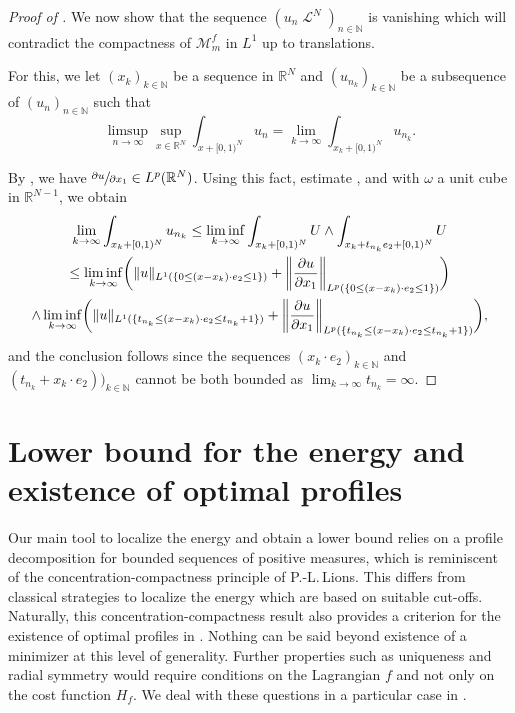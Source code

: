 \documentclass[10pt]{amsart}
\theoremstyle{plain}
\theoremstyle{definition}
\newcommand{\N}{\mathbb{N}}
\newcommand{\R}{\mathbb{R}}
\DeclarePairedDelimiter{\norm}{\lVert}{\rVert}
\DeclareMathOperator{\lbm}{\mathcal{L}}
\begin{document}
\begin{proof}[Proof of ]
We now show that the sequence \((u_n\lbm^N)_{n\in\N}\) is vanishing which will contradict the compactness of \(\mathcal{M}^f_m\) in \(L^1\) up to translations.

For this, we let \((x_k)_{k\in\N}\) be a sequence in \(\R^N\) and \((u_{n_k})_{k\in\N}\) be a subsequence of \((u_n)_{n\in\N}\) such that
\[
\limsup_{n\to\infty}\sup_{x\in\R^N}\int_{x+[0,1)^N}u_n=\lim_{k\to\infty}\int_{x_k+[0,1)^N}u_{n_k}.
\]

By , we have \(\sfrac{\partial u}{\partial x_1}\in L^p(\R^N)\). Using this fact, estimate , and  with $\omega$ a unit cube in $\R^{N-1}$, we obtain
\begin{multline*}
\lim_{k\to\infty}\int_{x_k+[0,1)^N}u_{n_k}\leq \liminf_{k\to\infty}\int_{x_k+[0,1)^N}U\wedge\int_{x_k+t_{n_k} e_2+[0,1)^N} U\\
\leq \liminf_{k\to\infty} \biggl(\norm{u}_{L^1(\{0\leq (x-x_k)\cdot e_2\leq 1\})}+
\norm*{\frac{\partial u}{\partial x_1}}_{L^p(\{0\leq (x-x_k)\cdot e_2\leq 1\})}\biggr)\\
\wedge\liminf_{k\to\infty} \biggl(
\norm{u}_{L^1(\{t_{n_k}\leq (x-x_k)\cdot e_2\leq t_{n_k}+1\})}+
\norm*{\frac{\partial u}{\partial x_1}}_{L^p(\{t_{n_k}\leq (x-x_k)\cdot e_2\leq t_{n_k}+1\})} \biggr),
\end{multline*}
and the conclusion follows since the sequences \((x_k\cdot e_2)_{k\in\N}\) and \((t_{n_k}+x_k\cdot e_2))_{k\in\N}\) cannot be both bounded as \(\lim_{k\to\infty}t_{n_k}=\infty\).
\end{proof}

\section{Lower bound for the energy and existence of optimal profiles}\label{sectionLowerBound}

Our main tool to localize the energy and obtain a lower bound relies on a profile decomposition for bounded sequences of positive measures, which is reminiscent of the concentration-compactness principle of P.-L.\,Lions. This differs from classical strategies to localize the energy which are based on suitable cut-offs. Naturally, this concentration-compactness result also provides a criterion for the existence of optimal profiles in . Nothing can be said beyond existence of a minimizer at this level of generality. Further properties such as uniqueness and radial symmetry would require conditions on the Lagrangian $f$ and not only on the cost function $H_f$. We deal with these questions in a particular case in .
\end{document}
